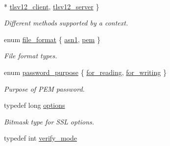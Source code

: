 \begin{DoxyCompactItemize}
\\*
\hyperlink{classasio_1_1ssl_1_1context__base_ac37d498266e3b13607f011ace6417525ae3a06b9301c367af76d1041e87e78a41}{tlsv12\+\_\+client}, 
\hyperlink{classasio_1_1ssl_1_1context__base_ac37d498266e3b13607f011ace6417525a5385a7af0a52e2fec3aaa0640d8433b0}{tlsv12\+\_\+server}
 \}\begin{DoxyCompactList}\small\item\em Different methods supported by a context. \end{DoxyCompactList}
\item 
enum \hyperlink{classasio_1_1ssl_1_1context__base_acc846aa73fffcab1fecad36dcf2be1fb}{file\+\_\+format} \{ \hyperlink{classasio_1_1ssl_1_1context__base_acc846aa73fffcab1fecad36dcf2be1fbaf660a6f4377540bad243a61b2a38bb32}{asn1}, 
\hyperlink{classasio_1_1ssl_1_1context__base_acc846aa73fffcab1fecad36dcf2be1fba2818111664c05c1582efc20e4cf82673}{pem}
 \}\begin{DoxyCompactList}\small\item\em File format types. \end{DoxyCompactList}
\item 
enum \hyperlink{classasio_1_1ssl_1_1context__base_a0e5aec1cd0f3db28becde1dca686c855}{password\+\_\+purpose} \{ \hyperlink{classasio_1_1ssl_1_1context__base_a0e5aec1cd0f3db28becde1dca686c855a7cc8a1fb57a6dd490a8c27df90b7bd2d}{for\+\_\+reading}, 
\hyperlink{classasio_1_1ssl_1_1context__base_a0e5aec1cd0f3db28becde1dca686c855a2aeb8ea67ad30131e6592a3605b2cb11}{for\+\_\+writing}
 \}\begin{DoxyCompactList}\small\item\em Purpose of P\+E\+M password. \end{DoxyCompactList}
\item 
typedef long \hyperlink{classasio_1_1ssl_1_1context__base_a12d5d28abeb47c91311bf13740dec514}{options}
\begin{DoxyCompactList}\small\item\em Bitmask type for S\+S\+L options. \end{DoxyCompactList}\item 
typedef int \hyperlink{classasio_1_1ssl_1_1context__base_aa9ef38ba747dd4e8ecb1f9a279a67d6b}{verify\+\_\+mode}
\end{DoxyCompactItemize}
